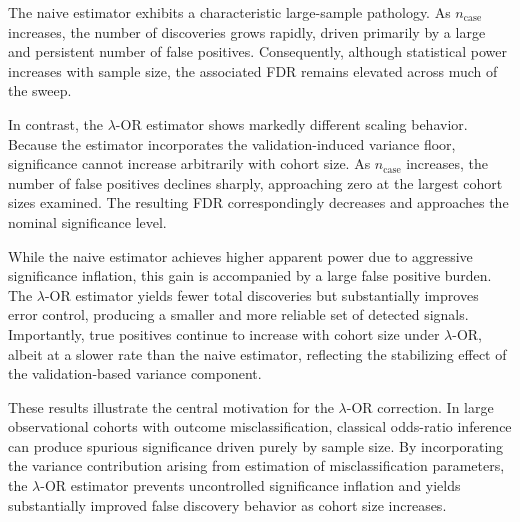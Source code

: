 \documentclass[pdflatex,sn-mathphys-num]{sn-jnl}%
\theoremstyle{thmstyleone}%
\theoremstyle{thmstyletwo}%
\theoremstyle{thmstylethree}%
\begin{document}
The naive estimator exhibits a characteristic large-sample pathology. As
\(n_{\mathrm{case}}\) increases, the number of discoveries grows rapidly, driven
primarily by a large and persistent number of false positives. Consequently,
although statistical power increases with sample size, the associated FDR remains
elevated across much of the sweep.

In contrast, the \(\lambda\)-OR estimator shows markedly different scaling
behavior. Because the estimator incorporates the validation-induced variance floor, significance cannot
increase arbitrarily with cohort size. As \(n_{\mathrm{case}}\) increases, the
number of false positives declines sharply, approaching zero at the largest
cohort sizes examined. The resulting FDR correspondingly decreases and approaches
the nominal significance level.

While the naive estimator achieves higher apparent power due to aggressive
significance inflation, this gain is accompanied by a large false positive burden.
The \(\lambda\)-OR estimator yields fewer total discoveries but substantially
improves error control, producing a smaller and more reliable set of detected
signals. Importantly, true positives continue to increase with cohort size under
\(\lambda\)-OR, albeit at a slower rate than the naive estimator, reflecting the
stabilizing effect of the validation-based variance component.

These results illustrate the central motivation for the \(\lambda\)-OR correction.
In large observational cohorts with outcome misclassification, classical
odds-ratio inference can produce spurious significance driven purely by sample
size. By incorporating the variance contribution arising from estimation of
misclassification parameters, the \(\lambda\)-OR estimator prevents uncontrolled
significance inflation and yields substantially improved false discovery behavior
as cohort size increases.
\end{document}
